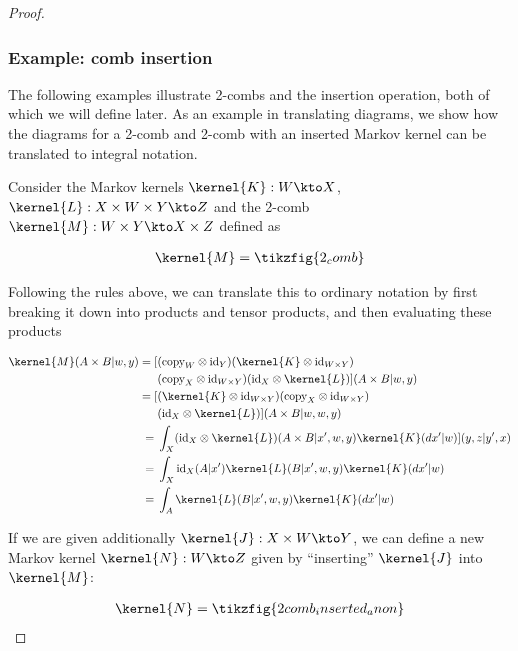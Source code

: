 \begin{proof}
\subsubsection{Example: comb insertion}

The following examples illustrate 2-combs and the insertion operation, both of which we will define later. As an example in translating diagrams, we show how the diagrams for a 2-comb and 2-comb with an inserted Markov kernel can be translated to integral notation.

Consider the Markov kernels $\kernel{K}:W\kto X$, $\kernel{L}:X\times W\times Y\kto Z$ and the 2-comb $\kernel{M}:W\times Y\kto X\times Z$ defined as

\begin{align}
    \kernel{M} = \tikzfig{2_comb}\label{eq:2comb_M}
\end{align}

Following the rules above, we can translate this to ordinary notation by first breaking it down into products and tensor products, and then evaluating these products

\begin{align}
    \kernel{M}(A\times B|w,y) = [&(\text{copy}_W\otimes \text{id}_Y)(\kernel{K}\otimes \text{id}_{W\times Y})\\
    &(\text{copy}_X\otimes \text{id}_{W\times Y})(\text{id}_X\otimes\kernel{L})](A\times B|w,y)\\
                        = [&(\kernel{K}\otimes \text{id}_{W\times Y})(\text{copy}_X\otimes \text{id}_{W\times Y})\\
                        &(\text{id}_X\otimes\kernel{L})](A\times B|w,w,y)\\
                        = \;&\int_{X}  (\text{id}_X\otimes\kernel{L})(A\times B|x',w,y) \kernel{K} (dx'|w)
                        ](y,z|y',x)\\
                        = \;&\int_X \text{id}_X(A|x') \kernel{L}(B|x',w,y)\kernel{K}(dx'|w)\\
                        = \;&\int_A \kernel{L}(B|x',w,y)\kernel{K}(dx'|w)
\end{align}

If we are given additionally $\kernel{J}:X\times W\kto Y$, we can define a new Markov kernel $\kernel{N}:W\kto Z$ given by ``inserting'' $\kernel{J}$ into $\kernel{M}$:

\begin{align}
    \kernel{N} = \tikzfig{2comb_inserted_anon}\label{eq:2comb_winsert}
\end{align}



\end{proof}
